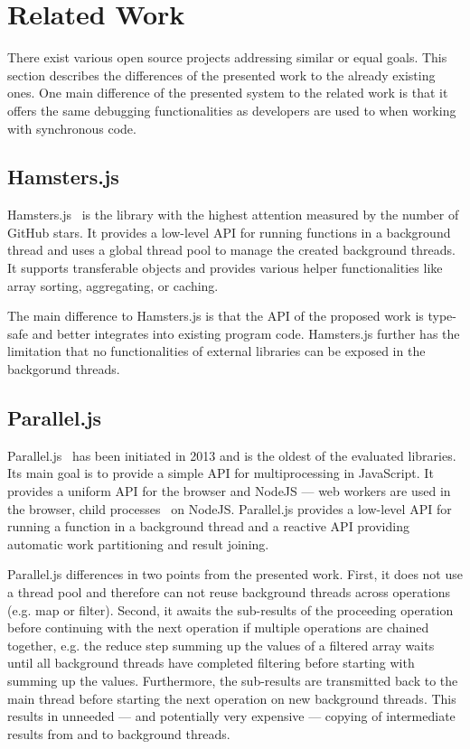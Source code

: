 \section{Related Work}\label{sec:related-work}
There exist various open source projects addressing similar or equal goals. This section describes the differences of the presented work to the already existing ones. One main difference of the presented system to the related work is that it offers the same debugging functionalities as developers are used to when working with synchronous code.

\subsection{Hamsters.js}
Hamsters.js~\cite{hamstersjs} is the library with the highest attention measured by the number of GitHub stars. It provides a low-level API for running functions in a background thread and uses a global thread pool to manage the created background threads. It supports transferable objects and provides various helper functionalities like array sorting, aggregating, or caching.

The main difference to Hamsters.js is that the API of the proposed work is type-safe and better integrates into existing program code. Hamsters.js further has the limitation that no functionalities of external libraries can be exposed in the backgorund threads.

\subsection{Parallel.js}
Parallel.js~\cite{SavitzkyMayr2016} has been initiated in 2013 and is the oldest of the evaluated libraries. Its main goal is to provide a simple API for multiprocessing in JavaScript. It provides a uniform API for the browser and NodeJS --- web workers are used in the browser, child processes~\cite{childProcess} on NodeJS. Parallel.js provides a low-level API for running a function in a background thread and a reactive API providing automatic work partitioning and result joining. 

Parallel.js differences in two points from the presented work. First, it does not use a thread pool and therefore can not reuse background threads across operations (e.g. map or filter). Second, it awaits the sub-results of the proceeding operation before continuing with the next operation if multiple operations are chained together, e.g. the reduce step summing up the values of a filtered array waits until all background threads have completed filtering before starting with summing up the values. Furthermore, the sub-results are transmitted back to the main thread before starting the next operation on new background threads. This results in unneeded --- and potentially very expensive --- copying of intermediate results from and to background threads.


